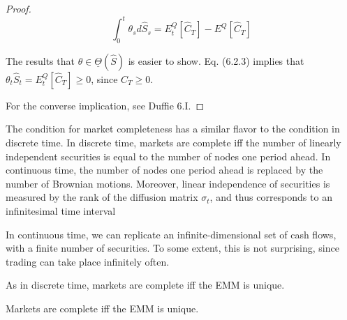 \documentclass[\topdir/lecture\_notes.tex]{subfiles}
\begin{document}
\begin{proof}
\begin{equation}
\int_{0}^{t} \theta_{s} d \hat{S}_{s}=E_{t}^{Q}\left[\hat{C}_{T}\right]-E^{Q}\left[\hat{C}_{T}\right] \label{eq:6.2.4}
\end{equation}

The results that $\theta \in \underline{\Theta}(\hat{S})$ is easier to show. Eq. (6.2.3) implies that $\theta_{t} \hat{S}_{t}=E_{t}^{Q}\left[\hat{C}_{T}\right] \geq 0$, since $C_{T} \geq 0$.

For the converse implication, see Duffie 6.I.
\end{proof}

The condition for market completeness has a similar flavor to the condition in discrete time. In discrete time, markets are complete iff the number of linearly independent securities is equal to the number of nodes one period ahead. In continuous time, the number of nodes one period ahead is replaced by the number of Brownian motions. Moreover, linear independence of securities is measured by the rank of the diffusion matrix $\sigma_{t}$, and thus corresponds to an infinitesimal time interval

In continuous time, we can replicate an infinite-dimensional set of cash flows, with a finite number of securities. To some extent, this is not surprising, since trading can take place infinitely often.

As in discrete time, markets are complete iff the EMM is unique.

\begin{theorem}\label{thm:6.2.2}
Markets are complete iff the EMM is unique.
\end{theorem}
\end{document}
